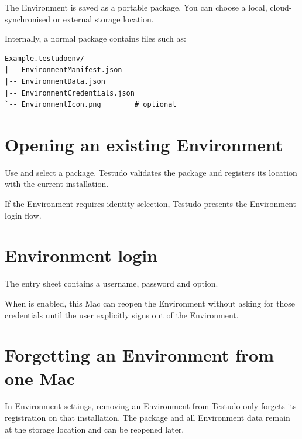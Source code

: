 \documentclass{testudomanual}
\begin{document}
The Environment is saved as a portable  package. You can choose a local, cloud-synchronised or external storage location.

Internally, a normal package contains files such as:
\begin{lstlisting}
Example.testudoenv/
|-- EnvironmentManifest.json
|-- EnvironmentData.json
|-- EnvironmentCredentials.json
`-- EnvironmentIcon.png        # optional
\end{lstlisting}

\section{Opening an existing Environment}

Use  and select a  package. Testudo validates the package and registers its location with the current installation.

If the Environment requires identity selection, Testudo presents the Environment login flow.

\section{Environment login}

The entry sheet contains a username, password and  option.

When  is enabled, this Mac can reopen the Environment without asking for those credentials until the user explicitly signs out of the Environment.

\section{Forgetting an Environment from one Mac}

In Environment settings, removing an Environment from Testudo only forgets its registration on that installation. The  package and all Environment data remain at the storage location and can be reopened later.


\end{document}
